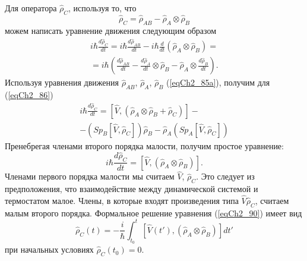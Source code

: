 Для оператора $\hat{\rho}_C$,  используя то, что  
\[
\hat{\rho}_C = \hat{\rho}_{AB} - \hat{\rho}_A \otimes \hat{\rho}_B
\]
можем написать уравнение движения следующим образом
\begin{eqnarray}
i \hbar \frac{d \hat{\rho}_C}{d t} = i \hbar \frac{d
  \hat{\rho}_{AB}}{d t} - i \hbar 
\frac{d}{d t} \left(\hat{\rho}_A \otimes \hat{\rho}_B\right) = 
\nonumber \\
= i \hbar
\left(
\frac{d \hat{\rho}_{AB}}{d t} -
\frac{d \hat{\rho}_{A}}{d t} \otimes \hat{\rho}_{B} - 
\hat{\rho}_{A} \otimes \frac{d \hat{\rho}_{B}}{d t}
\right).
\label{eqCh2_86}
\end{eqnarray}
Используя уравнения движения $\hat{\rho}_{AB}$, $\hat{\rho}_{A}$,
$\hat{\rho}_{B}$  (\ref{eqCh2_85a}),  получим для (\ref{eqCh2_86}) 
\begin{eqnarray}
i \hbar \frac{d \hat{\rho}_C}{d t} = 
\left[\hat{V}, \left(\hat{\rho}_A \otimes \hat{\rho}_B +
  \hat{\rho}_{C}\right)\right] - 
\nonumber \\
- 
\left(Sp_B\left[\hat{V}, \hat{\rho}_C\right]\right)\hat{\rho}_B -
\hat{\rho}_A \left(Sp_A\left[\hat{V}, \hat{\rho}_C\right]\right)
\label{eqCh2_89}
\end{eqnarray}
Пренебрегая членами второго порядка малости, получим простое уравнение:
\begin{equation}
i \hbar \frac{d \hat{\rho}_C}{d t} = 
\left[\hat{V}, \left(\hat{\rho}_A \otimes \hat{\rho}_B\right)\right]. 
\label{eqCh2_90}
\end{equation}
Членами первого порядка малости мы считаем $\hat{V}$, $\hat{\rho}_C$.
Это следует из предположения, что взаимодействие между динамической
системой и термостатом малое. Члены, в которые входят произведения
типа  $\hat{V}\hat{\rho}_C$, считаем малым второго порядка. Формальное
решение уравнения (\ref{eqCh2_90}) имеет вид  
\begin{equation}
\hat{\rho}_C\left(t\right) = - \frac{i}{\hbar}\int_{t_0}^t
\left[\hat{V}\left(t'\right), \left(\hat{\rho}_A \otimes
  \hat{\rho}_B\right)\right] dt' 
\label{eqCh2_91}
\end{equation}
при начальных условиях $\hat{\rho}_C\left(t_0\right) = 0$. 


